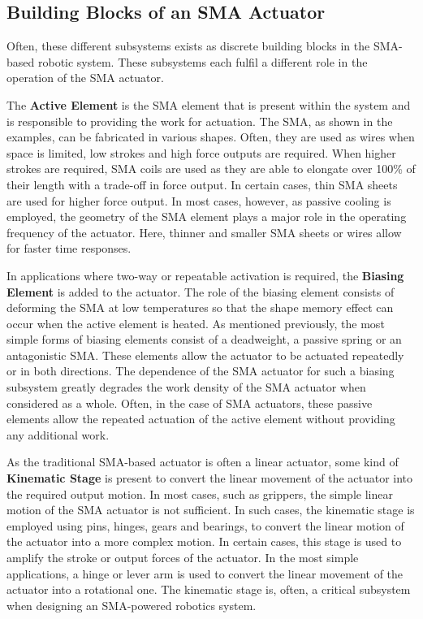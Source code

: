 \subsection{Building Blocks of an SMA Actuator}
Often, these different subsystems exists as discrete building blocks in the SMA-based robotic system. These subsystems each fulfil a different role in the operation of the SMA actuator.

The \textbf{Active Element} is the SMA element that is present within the system and is responsible to providing the work for actuation. The SMA, as shown in the examples, can be fabricated in various shapes. Often, they are used as wires when space is limited, low strokes and high force outputs are required. When higher strokes are required, SMA coils are used as they are able to elongate over 100\% of their length with a trade-off in force output. In certain cases, thin SMA sheets are used for higher force output. In most cases, however, as passive cooling is employed, the geometry of the SMA element plays a major role in the operating frequency of the actuator. Here, thinner and smaller SMA sheets or wires allow for faster time responses.

In applications where two-way or repeatable activation is required, the \textbf{Biasing Element} is added to the actuator. The role of the biasing element consists of deforming the SMA at low temperatures so that the shape memory effect can occur when the active element is heated. As mentioned previously, the most simple forms of biasing elements consist of a deadweight, a passive spring or an antagonistic SMA. These elements allow the actuator to be actuated repeatedly or in both directions. The dependence of the SMA actuator for such a biasing subsystem greatly degrades the work density of the SMA actuator when considered as a whole. Often, in the case of SMA actuators, these passive elements allow the repeated actuation of the active element without providing any additional work.

As the traditional SMA-based actuator is often a linear actuator, some kind of \textbf{Kinematic Stage} is present to convert the linear movement of the actuator into the required output motion. In most cases, such as grippers, the simple linear motion of the SMA actuator is not sufficient. In such cases, the kinematic stage is employed using pins, hinges, gears and bearings, to convert the linear motion of the actuator into a more complex motion. In certain cases, this stage is used to amplify the stroke or output forces of the actuator. In the most simple applications, a hinge or lever arm is used to convert the linear movement of the actuator into a rotational one. The kinematic stage is, often, a critical subsystem when designing an SMA-powered robotics system.

